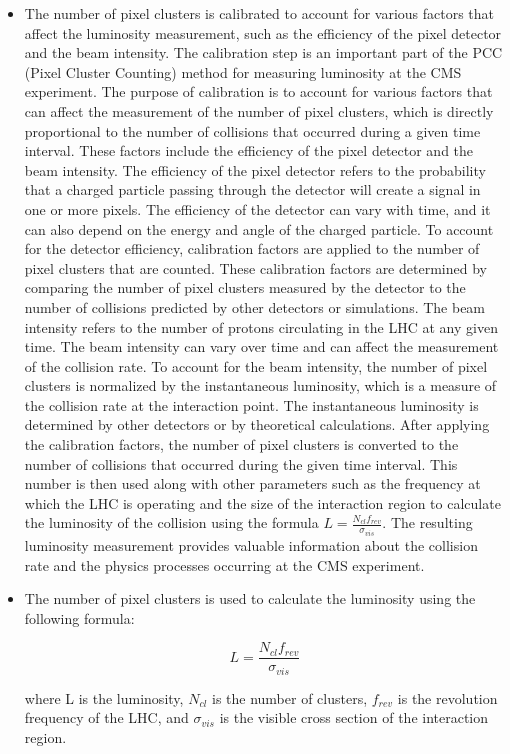 \begin{itemize}
\item The number of pixel clusters is calibrated to account for various factors that affect the luminosity measurement, such as the efficiency of the pixel detector and the beam intensity. The calibration step is an important part of the PCC (Pixel Cluster Counting) method for measuring luminosity at the CMS experiment. The purpose of calibration is to account for various factors that can affect the measurement of the number of pixel clusters, which is directly proportional to the number of collisions that occurred during a given time interval. These factors include the efficiency of the pixel detector and the beam intensity. The efficiency of the pixel detector refers to the probability that a charged particle passing through the detector will create a signal in one or more pixels. The efficiency of the detector can vary with time, and it can also depend on the energy and angle of the charged particle. To account for the detector efficiency, calibration factors are applied to the number of pixel clusters that are counted. These calibration factors are determined by comparing the number of pixel clusters measured by the detector to the number of collisions predicted by other detectors or simulations. The beam intensity refers to the number of protons circulating in the LHC at any given time. The beam intensity can vary over time and can affect the measurement of the collision rate. To account for the beam intensity, the number of pixel clusters is normalized by the instantaneous luminosity, which is a measure of the collision rate at the interaction point. The instantaneous luminosity is determined by other detectors or by theoretical calculations. After applying the calibration factors, the number of pixel clusters is converted to the number of collisions that occurred during the given time interval. This number is then used along with other parameters such as the frequency at which the LHC is operating and the size of the interaction region to calculate the luminosity of the collision using the formula $L = \frac{N_{cl}  f_{rev}} {\sigma_{vis}} $. The resulting luminosity measurement provides valuable information about the collision rate and the physics processes occurring at the CMS experiment.

\item The number of pixel clusters is used to calculate the luminosity using the following formula:

\begin{equation}
 L = \frac{N_{cl} f_{rev} } {\sigma_{vis}}   
\end{equation}

where L is the luminosity, $N_{cl}$ is the number of clusters, $f_{rev}$ is the revolution frequency of the LHC, and $\sigma_{vis}$ is the visible cross section of the interaction region.

\end{itemize}


